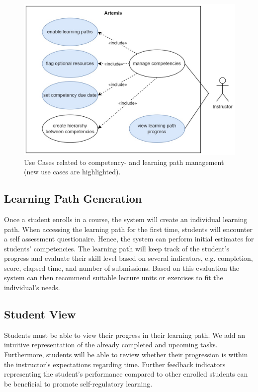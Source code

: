 \documentclass[a4paper,12pt,twoside]{article}
\begin{document}
\begin{figure}[h!]
        \centering
        \includegraphics[width=0.9\linewidth]{figures/UseCasesInstructor.jpg}
        \caption{Use Cases related to competency- and learning path management (new use cases are highlighted).}
        \label{fig:UseCasesInstructor}
\end{figure}

\subsection{Learning Path Generation}
Once a student enrolls in a course, the system will create an individual learning path. When accessing the learning path for the first time,
students will encounter a self assessment questionaire. Hence, the system can perform initial estimates for students' competencies.
The learning path will keep track of the student's progress and evaluate their skill level based on several indicators, e.g. completion, score,
elapsed time, and number of submissions. Based on this evaluation the system can then recommend suitable lecture units or exercises to fit the
individual's needs.

\subsection{Student View}
Students must be able to view their progress in their learning path. We add an intuitive representation of the already completed and upcoming tasks.
Furthermore, students will be able to review whether their progression is within the instructor's expectations regarding time. Further feedback indicators
representing the student's performance compared to other enrolled students can be beneficial to promote self-regulatory learning.
\end{document}
